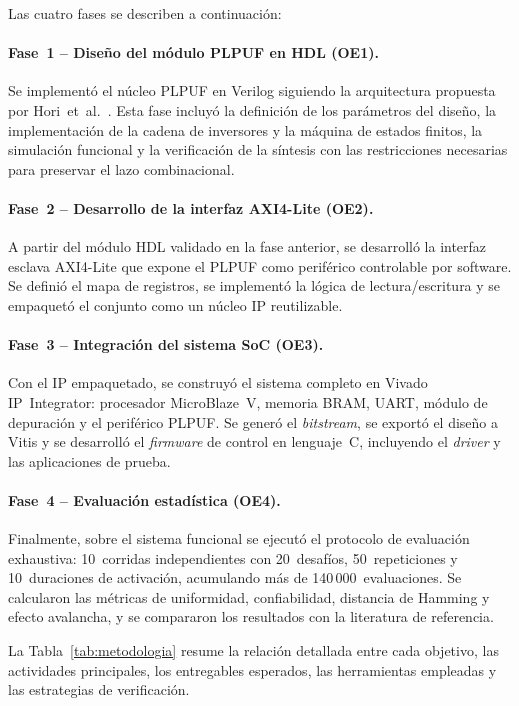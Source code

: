 Las cuatro fases se describen a continuación:

\paragraph{Fase~1 -- Diseño del módulo PLPUF en HDL (OE1).}
Se implementó el núcleo PLPUF en Verilog siguiendo la arquitectura propuesta
por Hori~et~al.~\cite{hori_2011_pseudolfsr}. Esta fase incluyó la
definición de los parámetros del diseño, la implementación de la cadena de
inversores y la máquina de estados finitos, la simulación funcional y la
verificación de la síntesis con las restricciones necesarias para preservar
el lazo combinacional.

\paragraph{Fase~2 -- Desarrollo de la interfaz AXI4-Lite (OE2).}
A partir del módulo HDL validado en la fase anterior, se desarrolló la
interfaz esclava AXI4-Lite que expone el PLPUF como periférico controlable
por software. Se definió el mapa de registros, se implementó la lógica de
lectura/escritura y se empaquetó el conjunto como un núcleo IP reutilizable.

\paragraph{Fase~3 -- Integración del sistema SoC (OE3).}
Con el IP empaquetado, se construyó el sistema completo en Vivado
IP~Integrator: procesador MicroBlaze~V, memoria BRAM, UART, módulo de
depuración y el periférico PLPUF. Se generó el \textit{bitstream}, se
exportó el diseño a Vitis y se desarrolló el \textit{firmware} de control en
lenguaje~C, incluyendo el \textit{driver} y las aplicaciones de prueba.

\paragraph{Fase~4 -- Evaluación estadística (OE4).}
Finalmente, sobre el sistema funcional se ejecutó el protocolo de evaluación
exhaustiva: 10~corridas independientes con 20~desafíos, 50~repeticiones y
10~duraciones de activación, acumulando más de 140\,000~evaluaciones. Se
calcularon las métricas de uniformidad, confiabilidad, distancia de Hamming y
efecto avalancha, y se compararon los resultados con la literatura de
referencia.

\bigskip
La Tabla~\ref{tab:metodologia} resume la relación detallada entre cada
objetivo, las actividades principales, los entregables esperados, las
herramientas empleadas y las estrategias de verificación.

